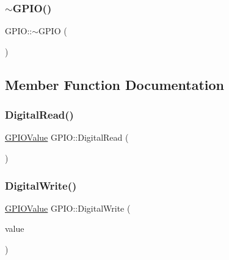 \subsubsection{\texorpdfstring{$\sim$\+G\+P\+I\+O()}{~GPIO()}}
{\footnotesize\ttfamily G\+P\+I\+O\+::$\sim$\+G\+P\+IO (\begin{DoxyParamCaption}{ }\end{DoxyParamCaption})\hspace{0.3cm}{\ttfamily [virtual]}}



\subsection{Member Function Documentation}
\mbox{\label{classcubesat_1_1GPIO_a427ef463f54d768e8d9b6abc449c5d9f}} 
\subsubsection{\texorpdfstring{Digital\+Read()}{DigitalRead()}}
{\footnotesize\ttfamily \hyperlink{namespacecubesat_ac60a35ee01913deca5e771944eb902ed}{G\+P\+I\+O\+Value} G\+P\+I\+O\+::\+Digital\+Read (\begin{DoxyParamCaption}{ }\end{DoxyParamCaption})}

\mbox{\label{classcubesat_1_1GPIO_a27eaf22ac52502400ffeddf7c90506ed}} 
\subsubsection{\texorpdfstring{Digital\+Write()}{DigitalWrite()}}
{\footnotesize\ttfamily \hyperlink{namespacecubesat_ac60a35ee01913deca5e771944eb902ed}{G\+P\+I\+O\+Value} G\+P\+I\+O\+::\+Digital\+Write (\begin{DoxyParamCaption}\item[{\hyperlink{namespacecubesat_ac60a35ee01913deca5e771944eb902ed}{G\+P\+I\+O\+Value}}]{value }\end{DoxyParamCaption})}

\mbox{\label{classcubesat_1_1GPIO_a3df734f0471cf7e7038c186c80b14995}} 

